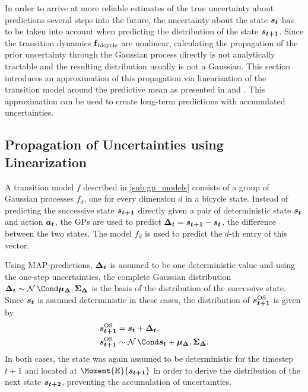 In order to arrive at more reliable estimates of the true uncertainty about predictions several steps into the future, the uncertainty about the state $\bm{s_t}$ has to be taken into account when predicting the distribution of the state $\bm{s_{t+1}}$.
Since the transition dynamics $\operatorname{\operatorname{\mathbf{f}}_{\text{bicycle}}}$ are nonlinear, calculating the propagation of the prior uncertainty through the Gaussian process directly is not analytically tractable and the resulting distribution usually is not a Gaussian.
This section introduces an approximation of this propagation via linearization of the transition model around the predictive mean as presented in \cite{ko_gp-bayesfilters:_2009} and \cite{deisenroth_gaussian_2015}.
This approximation can be used to create long-term predictions with accumulated uncertainties.

\subsection{Propagation of Uncertainties using Linearization}
\label{sub:linearization}
A transition model $f$ described in \cref{sub:gp_models} consists of a group of Gaussian processes $f_d$, one for every dimension $d$ in a bicycle state.
Instead of predicting the successive state $\bm{s_{t+1}}$ directly given a pair of deterministic state $\bm{s_t}$ and action $\bm{a_t}$, the GPs are used to predict $\bm{\Delta_t} = \bm{s_{t+1}} - \bm{s_t}$, the difference between the two states.
The model $f_d$ is used to predict the $d$-th entry of this vector.

Using MAP-predictions, $\bm{\Delta_t}$ is assumed to be one deterministic value and using the one-step uncertainties, the complete Gaussian distribution $\rv{\Delta_t} \sim \Gaussian{\mat{\mu_\Delta}, \mat{\Sigma_\Delta}}$ is the basis of the distribution of the successive state.
Since $\bm{s_t}$ is assumed deterministic in these cases, the distribution of $\bm{s_{t+1}}^{\text{OS}}$ is given by
\begin{align}
    \begin{split}
        \os{\rv{s_{t+1}}} &= \mat{s_t} + \rv{\Delta_t}, \\
        \os{\rv{s_{t+1}}} &\sim \Gaussian{\mat{s_t} + \mat{\mu_\Delta}, \mat{\Sigma_\Delta}}.
    \end{split}
\end{align}
In both cases, the state was again assumed to be deterministic for the timestep $t+1$ and located at $\Moment{\E}{\rv{s_{t+1}}}$ in order to derive the distribution of the next state $\bm{s_{t+2}}$, preventing the accumulation of uncertainties.

